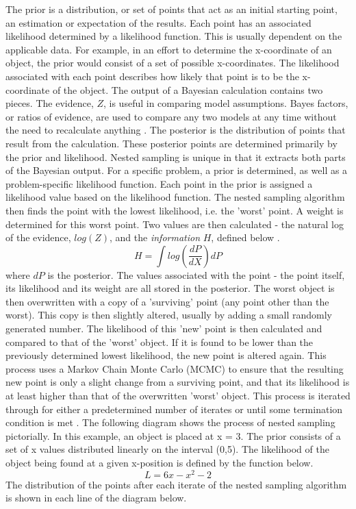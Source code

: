 \documentclass[a4paper,12pt]{article}
\begin{document}
The prior is a distribution, or set of points that act as an initial starting point, an estimation or expectation of the results.  Each point has an associated likelihood determined by a likelihood function.  This is usually dependent on the applicable data.  For example, in an effort to determine the x-coordinate of an object, the prior would consist of a set of possible x-coordinates.  The likelihood associated with each point describes how likely that point is to be the x-coordinate of the object.
\newline
The output of a Bayesian calculation contains two pieces. The evidence, $Z$, is useful in comparing model assumptions.  Bayes factors, or ratios of evidence, are used to compare any two models at any time without the need to recalculate anything \cite{skilling}. The posterior is the distribution of points that result from the calculation.  These posterior points are determined primarily by the prior and likelihood.
\newline
Nested sampling is unique in that it extracts both parts of the Bayesian output.  For a specific problem, a prior is determined, as well as a problem-specific likelihood function.  Each point in the prior is assigned a likelihood value based on the likelihood function.  The nested sampling algorithm then finds the point with the lowest likelihood, i.e. the 'worst' point. A weight is determined for this worst point. Two values are then calculated - the natural log of the evidence, $log(Z)$, and the \textit{information} $H$, defined below \cite{sivia}.
\begin{equation}
 H = \int log(\frac{dP}{dX})dP
\end{equation}
where $dP$ is the posterior.  The values associated with the point - the point itself, its likelihood and its weight are all stored in the posterior.  The worst object is then overwritten with a copy of a 'surviving' point (any point other than the worst).  This copy is then slightly altered, usually by adding a small randomly generated number.  The likelihood of this 'new' point is then calculated and compared to that of the 'worst' object.  If it is found to be lower than the previously determined lowest likelihood, the new point is altered again.  This process uses a Markov Chain Monte Carlo (MCMC) to ensure that the resulting new point is only a slight change from a surviving point, and that its likelihood is at least higher than that of the overwritten 'worst' object.
\newline
This process is iterated through for either a predetermined number of iterates or until some termination condition is met \cite{skilling,sivia}.
\newline
The following diagram shows the process of nested sampling pictorially.  In this example, an object is placed at x = 3.  The prior consists of a set of x values distributed linearly on the interval (0,5).  The likelihood of the object being found at a given x-position is defined by the function below.
\begin{equation}
 L = 6x - x^{2} - 2
\end{equation}
The distribution of the points after each iterate of the nested sampling algorithm is shown in each line of the diagram below.
\end{document}

